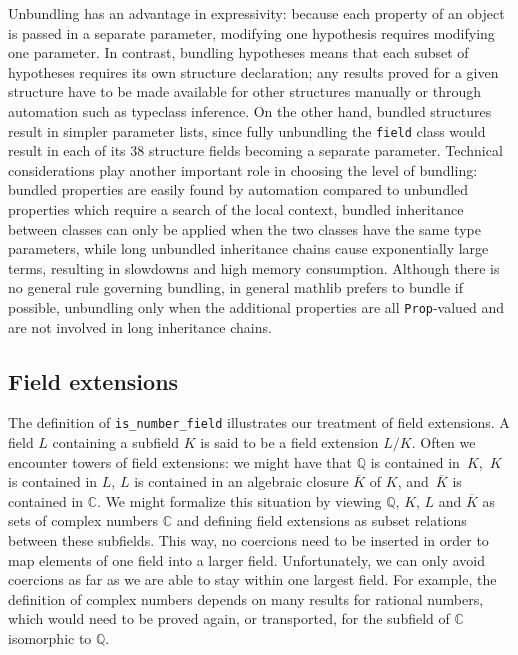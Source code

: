 \documentclass[sn-mathphys]{sn-jnl}%
\renewcommand{\C}{\mathbb{C}}
\newcommand{\lean}[1]{\texttt{#1}\xspace}
\newcommand{\mathlib}{\textsf{mathlib}\xspace}
\newcommand{\QQ}{\mathbb{Q}}
\begin{document}
Unbundling has an advantage in expressivity: because each property of an object is passed in a separate parameter,
modifying one hypothesis requires modifying one parameter.
In contrast, bundling hypotheses means that each subset of hypotheses requires its own structure declaration;
any results proved for a given structure have to be made available for other structures manually or through automation such as typeclass inference.
On the other hand, bundled structures result in simpler parameter lists, since fully unbundling the \lstinline{field} class would result in each of its 38 structure fields becoming a separate parameter.
Technical considerations play another important role in choosing the level of bundling:
bundled properties are easily found by automation compared to unbundled properties which require a search of the local context,
bundled inheritance between classes can only be applied when the two classes have the same type parameters,
while long unbundled inheritance chains cause exponentially large terms, resulting in slowdowns and high memory consumption.
Although there is no general rule governing bundling, in general \mathlib prefers to bundle if possible,
unbundling only when the additional properties are all \lean{Prop}-valued and are not involved in long inheritance chains.

\subsection{Field extensions} \label{sec:field_extension}

The definition of \lean{is\_number\_field} illustrates our treatment of field extensions.
A field $L$ containing a subfield $K$ is said to be a field extension $L / K$.
Often we encounter towers of field extensions: we might have that $\QQ$ is contained in~$K$,~$K$ is contained in $L$, $L$ is contained in an algebraic closure $\overline{K}$ of $K$, and~$\overline{K}$ is contained in $\C$.
We might formalize this situation by viewing $\QQ$, $K$, $L$ and $\overline{K}$ as sets of complex numbers $\C$ and defining field extensions as subset relations between these subfields.
This way, no coercions need to be inserted in order to map elements of one field into a larger field.
Unfortunately, we can only avoid coercions as far as we are able to stay within one largest field.
For example, the definition of complex numbers depends on many results for rational numbers, which would need to be proved again, or transported, for the subfield of $\C$ isomorphic to $\QQ$.
\end{document}
